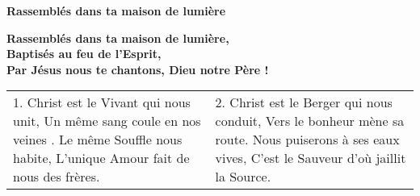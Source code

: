 \textbf{Rassemblés dans ta maison de lumière}

\textbf{
Rassemblés dans ta maison de lumière,\\
Baptisés au feu de l’Esprit,\\
Par Jésus nous te chantons, Dieu notre Père !
}

\begin{tabular}{p{} p{}}
1.
Christ est le Vivant qui nous unit,\newline
Un même sang coule en nos veines .\newline
Le même Souffle nous habite,\newline
L’unique Amour fait de nous des frères.
&
2.
Christ est le Berger qui nous conduit,\newline
Vers le bonheur mène sa route.\newline
Nous puiserons à ses eaux vives,\newline
C’est le Sauveur d’où jaillit la Source.
\end{tabular}

